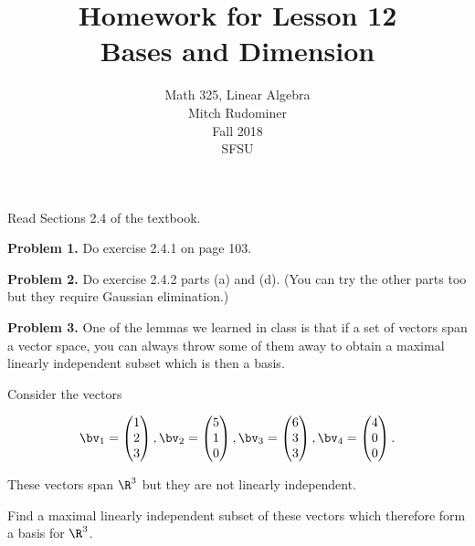 \documentclass[oneside,12pt]{amsart}
\begin{document}
\title{Homework for Lesson 12 \\ Bases and Dimension}
\author{Math 325, Linear Algebra \\ Mitch Rudominer \\ Fall 2018 \\ SFSU }
\date{}

\maketitle

Read Sections 2.4 of the textbook.

\bigskip

\textbf{Problem 1.} Do exercise 2.4.1 on page 103.

\bigskip
\bigskip
\bigskip
\bigskip
\bigskip
\bigskip

\textbf{Problem 2.} Do exercise 2.4.2 parts (a) and (d). (You can
try the other parts too but they require Gaussian elimination.)

\bigskip
\bigskip
\bigskip
\bigskip
\bigskip
\bigskip


\textbf{Problem 3.} One of the lemmas we learned in class is that if a set
of vectors span a vector space, you can always throw some of them away to
obtain a maximal linearly independent subset which is then a basis.

Consider the vectors

$$
\bv_1 =
\begin{pmatrix}
1 \\ 2 \\3
\end{pmatrix},
\bv_2 =
\begin{pmatrix}
5 \\ 1 \\ 0
\end{pmatrix},
\bv_3 =
\begin{pmatrix}
6 \\ 3 \\ 3
\end{pmatrix},
\bv_4 =
\begin{pmatrix}
4 \\ 0 \\ 0
\end{pmatrix}.
$$

These vectors span $\R^3$ but they are not linearly independent.

Find a maximal linearly independent subset of these vectors which therefore
form a basis for $\R^3$.

\newpage
\end{document}

